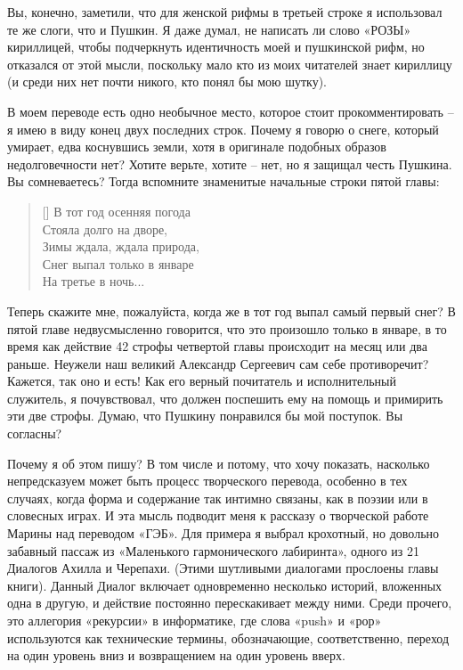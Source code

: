 \documentclass[../main.tex]{subfiles}
\begin{document}
Вы, конечно, заметили, что для женской рифмы в третьей строке я использовал те же слоги, что и Пушкин.
Я даже думал, не написать ли слово «РОЗЫ» кириллицей, чтобы подчеркнуть идентичность моей и пушкинской рифм, но отказался от этой мысли, поскольку мало кто из моих читателей знает кириллицу (и среди них нет почти никого, кто понял бы мою шутку).

В моем переводе есть одно необычное место, которое стоит прокомментировать \--- я имею в виду конец двух последних строк.
Почему я говорю о снеге, который умирает, едва коснувшись земли, хотя в оригинале подобных образов недолговечности нет?
Хотите верьте, хотите \--- нет, но я защищал честь Пушкина.
Вы сомневаетесь?
Тогда вспомните знаменитые начальные строки пятой главы:

\settowidth{\versewidth}{Зимы ждала, ждала природа,}
\begin{verse}[\versewidth]
    В тот год осенняя погода \\
    Стояла долго на дворе, \\
    Зимы ждала, ждала природа, \\
    Снег выпал только в январе \\
    На третье в ночь...
\end{verse}

Теперь скажите мне, пожалуйста, когда же в тот год выпал самый первый снег?
В пятой главе недвусмысленно говорится, что это произошло только в январе, в то время как действие 42 строфы четвертой главы происходит на месяц или два раньше.
Неужели наш великий Александр Сергеевич сам себе противоречит?
Кажется, так оно и есть!
Как его верный почитатель и исполнительный служитель, я почувствовал, что должен поспешить ему на помощь и примирить эти две строфы.
Думаю, что Пушкину понравился бы мой поступок.
Вы согласны?

Почему я об этом пишу?
В том числе и потому, что хочу показать, насколько непредсказуем может быть процесс творческого перевода, особенно в тех случаях, когда форма и содержание так интимно связаны, как в поэзии или в словесных играх.
И эта мысль подводит меня к рассказу о творческой работе Марины над переводом «ГЭБ».
Для примера я выбрал крохотный, но довольно забавный пассаж из «Маленького гармонического лабиринта», одного из 21 Диалогов Ахилла и Черепахи. (Этими шутливыми диалогами прослоены главы книги).
Данный Диалог включает одновременно несколько историй, вложенных одна в другую, и действие постоянно перескакивает между ними.
Среди прочего, это аллегория «рекурсии» в информатике, где слова «push» и «рор» используются как технические термины, обозначающие, соответственно, переход на один уровень вниз и возвращением на один уровень вверх.
\end{document}
